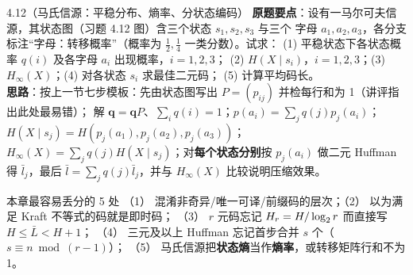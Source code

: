 \begin{example}{4.12（马氏信源：平稳分布、熵率、分状态编码）}
\textbf{原题要点}：设有一马尔可夫信源，其状态图（习题 4.12 图）含三个状态 $s_1,s_2,s_3$ 与三个
字母 $a_1,a_2,a_3$，各分支标注“字母：转移概率”（概率为 $\frac12,\frac14$ 一类分数）。试求：
(1) 平稳状态下各状态概率 $q(i)$ 及各字母 $a_i$ 出现概率，$i=1,2,3$；
(2) $H(X\mid s_i)$，$i=1,2,3$；(3) $H_\infty(X)$；(4) 对各状态 $s_i$ 求最佳二元码；
(5) 计算平均码长。\\
\textbf{思路}：按上一节七步模板：先由状态图写出 $P=(p_{ij})$ 并检每行和为 1（讲评指出此处最易错）；
解 $\boldsymbol q=\boldsymbol qP$、$\sum_iq(i)=1$；$p(a_i)=\sum_jq(j)p_j(a_i)$；
$H(X\mid s_j)=H\left(p_j(a_1),p_j(a_2),p_j(a_3)\right)$；
$H_\infty(X)=\sum_jq(j)H(X\mid s_j)$；对\textbf{每个状态分别}按 $p_j(a_i)$ 做二元 Huffman 得
$\bar l_j$，最后 $\bar l=\sum_jq(j)\bar l_j$，并与 $H_\infty(X)$ 比较说明压缩效果。
\end{example}

\begin{warning}{本章最容易丢分的 5 处}
（1） 混淆非奇异/唯一可译/前缀码的层次；（2） 以为满足 Kraft 不等式的码就是即时码；
（3） $r$ 元码忘记 $H_r=H/\log_{2} r$ 而直接写 $H\le\bar L<H+1$；
（4） 三元及以上 Huffman 忘记首步合并 $s$ 个（$s\equiv n\bmod(r-1)$）；
（5） 马氏信源把\textbf{状态熵}当作\textbf{熵率}，或转移矩阵行和不为 1。
\end{warning}
